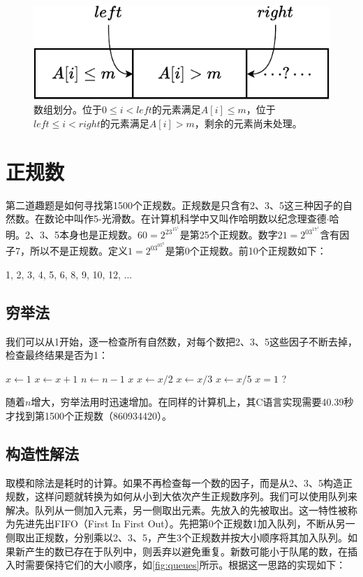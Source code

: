 \documentclass[b5paper]{ctexart}
\begin{document}
\begin{figure}[htbp]
  \centering
  \includegraphics[scale=0.7]{img/partition-by}  %
  \caption{数组划分。位于$0 \leq i < left$的元素满足$A[i] \leq m$，位于$left \leq i < right$的元素满足$A[i] > m$，剩余的元素尚未处理。}
  \label{fig:divide}
\end{figure}

\section*{正规数}

第二道趣题是如何寻找第1500个正规数。正规数是只含有2、3、5这三种因子的自然数。在数论中叫作5-光滑数。在计算机科学中又叫作哈明数以纪念理查德$\cdot$哈明。2、3、5本身也是正规数。$60 = 2^23^15^1$是第25个正规数。数字$21 = 2^03^17^1$含有因子7，所以不是正规数。定义$1=2^03^05^0$是第0个正规数。前10个正规数如下：

1, 2, 3, 4, 5, 6, 8, 9, 10, 12, ...

\subsection*{穷举法}
我们可以从1开始，逐一检查所有自然数，对每个数把2、3、5这些因子不断去掉，检查最终结果是否为1：

\begin{algorithmic}[1]
  \State $x \gets 1$
    \State $x \gets x + 1$
      \State $n \gets n - 1$
    \EndIf
  \EndWhile
  \State \Return $x$
\EndFunction
\Statex
{}
    \State $x \gets x / 2$
  \EndWhile
    \State $x \gets x / 3$
  \EndWhile
    \State $x \gets x / 5$
  \EndWhile
  \State \Return $x = 1$ ?
\EndFunction
\end{algorithmic}

随着$n$增大，穷举法用时迅速增加。在同样的计算机上，其C语言实现需要40.39秒才找到第1500个正规数（860934420）。

\subsection*{构造性解法}
取模和除法是耗时的计算\cite{Bentley}。如果不再检查每一个数的因子，而是从2、3、5构造正规数，这样问题就转换为如何从小到大依次产生正规数序列。我们可以使用队列来解决。队列从一侧加入元素，另一侧取出元素。先放入的先被取出。这一特性被称为先进先出FIFO（First In First Out）。先把第0个正规数1加入队列，不断从另一侧取出正规数，分别乘以2、3、5，产生3个正规数并按大小顺序将其加入队列。如果新产生的数已存在于队列中，则丢弃以避免重复。新数可能小于队尾的数，在插入时需要保持它们的大小顺序，如\cref{fig:queues}所示。根据这一思路的实现如下：
\end{document}
